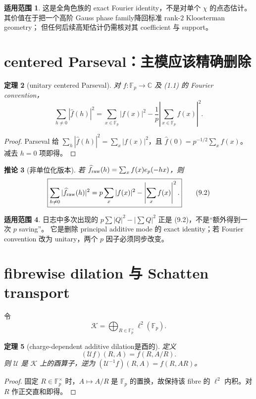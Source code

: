 \documentclass[11pt,a4paper]{ctexart}
\newtheorem{theorem}{定理}[section]
\newtheorem{corollary}[theorem]{推论}
\theoremstyle{definition}
\newtheorem{remark}[theorem]{适用范围}
\newcommand{\F}{\mathbb F}
\newcommand{\C}{\mathbb C}
\newcommand{\G}{\F_p^\times}
\newcommand{\ep}{e_p}
\newcommand{\1}{\mathbf 1}
\begin{document}
\begin{remark}
这是全角色族的 exact Fourier identity，不是对单个 $\chi$ 的点态估计。
其价值在于把一个高阶 Gauss phase family降回标准 rank-$2$ Kloosterman geometry；
但任何后续高矩估计仍需核对其 coefficient 与 support。
\end{remark}

\section{centered Parseval：主模应该精确删除}

\begin{theorem}[unitary centered Parseval]
对 $f:\F_p\to\C$ 及 (1.1) 的 Fourier convention，
\[
\boxed{
\sum_{h\ne0}|\widehat f(h)|^2
=\sum_{x\in\F_p}|f(x)|^2
-\frac1p\left|\sum_{x\in\F_p}f(x)\right|^2.}
\tag{9.1}
\]
\end{theorem}

\begin{proof}
Parseval 给 $\sum_h|\widehat f(h)|^2=\sum_x|f(x)|^2$，且
$\widehat f(0)=p^{-1/2}\sum_xf(x)$。减去 $h=0$ 项即得。
\end{proof}

\begin{corollary}[非单位化版本]
若 $\widehat f_{\rm raw}(h)=\sum_xf(x)\ep(-hx)$，则
\[
\boxed{
\sum_{h\ne0}|\widehat f_{\rm raw}(h)|^2
=p\sum_x|f(x)|^2-\left|\sum_xf(x)\right|^2.}
\tag{9.2}
\]
\end{corollary}

\begin{remark}
日志中多次出现的
$p\sum|Q|^2-|\sum Q|^2$ 正是 (9.2)，不是“额外得到一次 $p$ saving”。
它是删除 principal additive mode 的 exact identity；若 Fourier convention 改为
unitary，两个 $p$ 因子必须同步改变。
\end{remark}

\section{fibrewise dilation 与 Schatten transport}

令
\[
\mathscr K=\bigoplus_{R\in\G}\ell^2(\F_p).
\]

\begin{theorem}[charge-dependent additive dilation是酉的]
定义
\[
(\mathcal U f)(R,A)=f(R,A/R).
\tag{10.1}
\]
则 $\mathcal U$ 是 $\mathscr K$ 上的酉算子，逆为
\((\mathcal U^{-1}f)(R,A)=f(R,AR)\)。
\end{theorem}

\begin{proof}
固定 $R\in\G$ 时，$A\mapsto A/R$ 是 $\F_p$ 的置换，故保持该 fibre 的
$\ell^2$ 内积。对 $R$ 作正交直和即得。
\end{proof}
\end{document}
